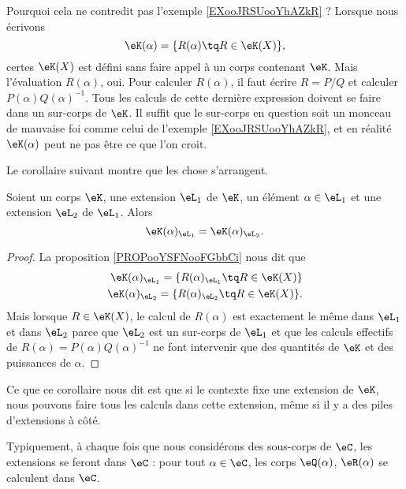 Pourquoi cela ne contredit pas l'exemple \ref{EXooJRSUooYhAZkR} ? Lorsque nous écrivons
\begin{equation}
    \eK(\alpha)=\{ R(\alpha)\tq R\in \eK(X) \},
\end{equation}
certes \( \eK(X)\) est défini sans faire appel à un corps contenant \( \eK\). Mais l'évaluation \( R(\alpha)\), oui. Pour calculer \( R(\alpha)\), il faut écrire \( R=P/Q\) et calculer \( P(\alpha)Q(\alpha)^{-1}\). Tous les calculs de cette dernière expression doivent se faire dans un sur-corps de \( \eK\). Il suffit que le sur-corps en question soit un monceau de mauvaise foi comme celui de l'exemple \ref{EXooJRSUooYhAZkR}, et en réalité \( \eK(\alpha)\) peut ne pas être ce que l'on croit.

Le corollaire suivant montre que les chose s'arrangent. 

\begin{corollary}
    Soient un corps \( \eK\), une extension \( \eL_1\) de \( \eK\), un élément \( \alpha\in \eL_1\) et une extension \( \eL_2\) de \( \eL_1\). Alors
    \begin{equation}
        \eK(\alpha)_{\eL_1}=\eK(\alpha)_{\eL_2}.
    \end{equation}
\end{corollary}

\begin{proof}
    La proposition \ref{PROPooYSFNooFGbbCi} nous dit que
    \begin{subequations}
        \begin{align}
            \eK(\alpha)_{\eL_1}=\{ R(\alpha)_{\eL_1}\tq R\in\eK(X) \}\\
            \eK(\alpha)_{\eL_2}=\{ R(\alpha)_{\eL_2}\tq R\in\eK(X) \}.
        \end{align}
    \end{subequations}
    Mais lorsque \( R\in \eK(X)\), le calcul de \( R(\alpha)\) est exactement le même dans \( \eL_1\) et dans \( \eL_2\) parce que \( \eL_2\) est un sur-corps de \( \eL_1\) et que les calculs effectifs de \( R(\alpha)=P(\alpha)Q(\alpha)^{-1}\) ne font intervenir que des quantités de \( \eK\) et des puissances de \( \alpha\).
\end{proof}

Ce que ce corollaire nous dit est que si le contexte fixe une extension de \( \eK\), nous pouvons faire tous les calculs dans cette extension, même si il y a des piles d'extensions à côté.

Typiquement, à chaque fois que nous considérons des sous-corps de \( \eC\), les extensions se feront dans \( \eC\) : pour tout \( \alpha\in \eC\), les corps \( \eQ(\alpha)\), \( \eR(\alpha)\) se calculent dans \( \eC\).

